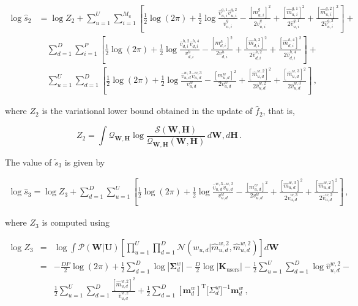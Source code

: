 \documentclass{article}
\begin{document}
\begin{align}
\log\hat{s}_2 & = \log Z_2 + \sum_{u=1}^{U}\sum_{i=1}^{M_u}\left[\frac{1}{2}\log(2\pi)+
\frac{1}{2}\log \frac{\hat{v}_{u,i}^{g,1}\hat{v}_{u,i}^{g,2}}{v_{u,i}^g}-
\frac{[m_{u,i}^g]^2}{2v_{u,i}^g}+\frac{[\hat{m}_{u,i}^{g,1}]^2}{2\hat{v}_{u,i}^{g,1}}+
\frac{[\hat{m}_{u,i}^{g,2}]^2}{2\hat{v}_{u,i}^{g,2}}\right]+\nonumber\\
& \quad \sum_{d=1}^{D}\sum_{i=1}^{P}\left[\frac{1}{2}\log(2\pi)+
\frac{1}{2}\log \frac{\hat{v}_{d,i}^{h,2}\hat{v}_{d,i}^{h,4}}{v_{d,i}^h}-
\frac{[m_{d,i}^h]^2}{2v_{d,i}^h}+\frac{[\hat{m}_{d,i}^{h,2}]^2}{2\hat{v}_{d,i}^{h,2}}+
\frac{[\hat{m}_{d,i}^{h,4}]^2}{2\hat{v}_{d,i}^{h,4}}\right]+\nonumber\\
& \quad \sum_{u=1}^{U}\sum_{d=1}^{D}\left[\frac{1}{2}\log(2\pi)+
\frac{1}{2}\log \frac{\hat{v}_{u,d}^{w,2}\hat{v}_{u,d}^{w,3}}{v_{u,d}^w}-
\frac{[m_{u,d}^w]^2}{2v_{u,d}^w}+\frac{[\hat{m}_{u,d}^{w,2}]^2}{2\hat{v}_{u,d}^{w,2}}+
\frac{[\hat{m}_{u,d}^{w,3}]^2}{2\hat{v}_{u,d}^{w,3}}\right]\,,
\end{align}

where $Z_2$ is the variational lower bound obtained in the update of $\hat{f}_2$, that is,

\begin{equation}
Z_2 = \int \mathcal{Q}_{\mathbf{W},\mathbf{H}}\log\frac{\mathcal{S}(\mathbf{W},\mathbf{H})}
{\mathcal{Q}_{\mathbf{W},\mathbf{H}}(\mathbf{W},\mathbf{H})} \,d\mathbf{W},d\mathbf{H}\,.
\end{equation}

The value of $\tilde{s}_{3}$ is given by

\begin{align}
\log\hat{s}_3 = \log Z_3 + \sum_{d=1}^{D}\sum_{u=1}^{U}\left[
\frac{1}{2}\log(2\pi)+\frac{1}{2}\log \frac{\hat{v}_{u,d}^{w,3} \hat{v}_{u,d}^{w,2}}{v_{u,d}^w}-
\frac{[m_{u,d}^w]^2}{2v_{u,d}^w}+\frac{[\hat{m}_{u,d}^{w,3}]^2}{2\hat{v}_{u,d}^{w,3}}+
\frac{[\hat{m}_{u,d}^{w,2}]^2}{2\hat{v}_{u,d}^{w,2}}\right]\,,
\end{align}

where $Z_3$ is computed using

\begin{eqnarray}
\log Z_{3} & = & \log \int \mathcal{P}(\mathbf{W}|\mathbf{U})\left[\prod_{u=1}^{U}\prod_{d=1}^{D}
\mathcal{N}(w_{u,d}|\hat{m}_{u,d}^{w,2},\hat{m}_{u,d}^{w,2})\right]d\mathbf{W}\nonumber\\
& = & -\frac{DP}{2}\log(2\pi) + \frac{1}{2}\sum_{d=1}^D\log|\bm \Sigma_d^w| -
\frac{D}{2}\log|\mathbf{K}_\text{users}| - \frac{1}{2} \sum_{u=1}^U\sum_{d=1}^D \log \hat{v}_{u,d}^{w,2} - \nonumber \\
& & \frac{1}{2} \sum_{u=1}^U\sum_{d=1}^D \frac{[\hat{m}_{u,d}^{w,2}]^2}{\hat{v}_{u,d}^{w,2}} +
\frac{1}{2} \sum_{d=1}^D [\mathbf{m}_d^w]^\text{T} \bm [\Sigma_d^w]^{-1} \mathbf{m}_d^w\,,\label{eq:Z3}
\end{eqnarray}
\end{document}

